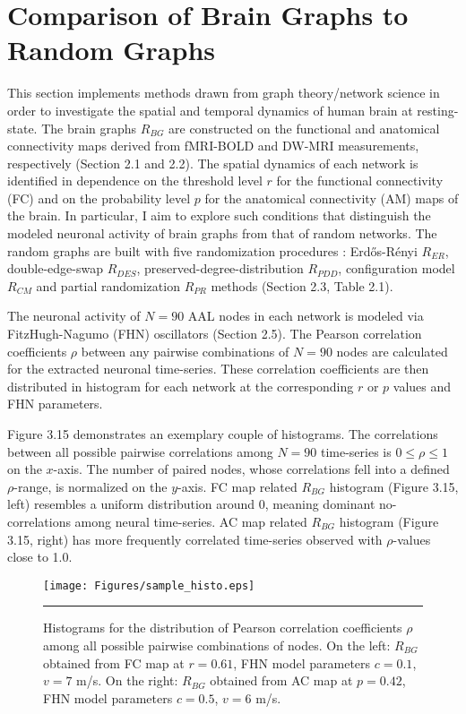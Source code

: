 \section{Comparison of Brain Graphs to Random Graphs}

This section implements methods drawn from graph theory/network science in order to investigate the spatial and temporal dynamics of human brain at resting-state. The brain graphs $R_{BG}$ are constructed on the functional and anatomical connectivity maps derived from fMRI-BOLD and DW-MRI measurements, respectively (Section 2.1 and 2.2). The spatial dynamics of each network is identified in dependence on the threshold level $r$ for the functional connectivity (FC) and on the probability level $p$ for the anatomical connectivity (AM) maps of the brain. In particular, I aim to explore such conditions that distinguish the modeled neuronal activity of brain graphs from that of random networks. The random graphs are built with five randomization procedures : Erd\H{o}s-R\'{e}nyi $R_{ER}$, double-edge-swap $R_{DES}$, preserved-degree-distribution $R_{PDD}$, configuration model $R_{CM}$ and partial randomization $R_{PR}$ methods (Section 2.3, Table 2.1).  

The neuronal activity of $N=90$ AAL nodes in each network is modeled via FitzHugh-Nagumo (FHN) oscillators \citep{VUK13, GHO08a} (Section 2.5). The Pearson correlation coefficients $\rho$ between any pairwise combinations of $N=90$ nodes are calculated for the extracted neuronal time-series. These correlation coefficients are then distributed in histogram for each network at the corresponding $r$ or $p$ values and FHN parameters.

Figure 3.15 demonstrates an exemplary couple of histograms. The correlations between all possible pairwise correlations among $N=90$ time-series is $ 0 \leq \rho \leq 1$ on the $x$-axis. The number of paired nodes, whose correlations fell into a defined $\rho$-range, is normalized on the $y$-axis. FC map related $R_{BG}$ histogram (Figure 3.15, left) resembles a uniform distribution around 0, meaning dominant no-correlations among neural time-series. AC map related $R_{BG}$  histogram (Figure 3.15, right) has more frequently correlated time-series observed with $\rho$-values close to 1.0.  


\begin{figure}[htbp]
 
  \centering
	 \texttt{[image: Figures/sample\_histo.eps]}
	 \rule{35em}{0.5pt}
  \caption[Sample Histogram for Brain Graph]{Histograms for the distribution of Pearson correlation coefficients $\rho$  among all possible pairwise combinations of nodes. On the left: $R_{BG}$ obtained from FC map at $r=0.61$, FHN model parameters $c=0.1$, $v=7$ m/s. On the right: $R_{BG}$ obtained from AC map at $p=0.42$, FHN model parameters $c=0.5$, $v=6$ m/s. } 
    \label{fig:Sample Histogram for Brain Graph}
 	
\end{figure}  


